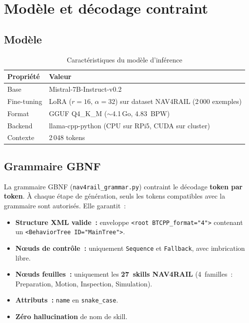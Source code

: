 \documentclass[a4paper,11pt]{article}
\newcommand{\file}[1]{\texttt{#1}}
\begin{document}
\section{Modèle et décodage contraint}
\label{sec:model}

\subsection{Modèle}

\begin{table}[H]
\centering
\caption{Caractéristiques du modèle d'inférence}
\label{tab:model}
\begin{tabularx}{\textwidth}{@{}l X@{}}
\toprule
\textbf{Propriété} & \textbf{Valeur} \\
\midrule
Base         & Mistral-7B-Instruct-v0.2 \\
Fine-tuning  & LoRA ($r=16$, $\alpha=32$) sur dataset NAV4RAIL (2\,000 exemples) \\
Format       & GGUF Q4\_K\_M ($\sim$4.1\,Go, 4.83~BPW) \\
Backend      & llama-cpp-python (CPU sur RPi5, CUDA sur cluster) \\
Contexte     & 2\,048 tokens \\
\bottomrule
\end{tabularx}
\end{table}

\subsection{Grammaire GBNF}
\label{sec:gbnf}

La grammaire GBNF (\file{nav4rail\_grammar.py}) contraint le décodage
\textbf{token par token}. À chaque étape de génération, seuls les tokens
compatibles avec la grammaire sont autorisés. Elle garantit~:

\begin{itemize}
    \item \textbf{Structure XML valide~:} enveloppe
    \texttt{<root BTCPP\_format="4">} contenant un \texttt{<Behavior\-Tree ID="MainTree">}.
    \item \textbf{Nœuds de contrôle~:} uniquement \texttt{Sequence} et
    \texttt{Fallback}, avec imbrication libre.
    \item \textbf{Nœuds feuilles~:} uniquement les \textbf{27~skills
    NAV4RAIL} (4~familles~: Preparation, Motion, Inspection, Simulation).
    \item \textbf{Attributs~:} \texttt{name} en \texttt{snake\_case}.
    \item \textbf{Zéro hallucination} de nom de skill.
\end{itemize}
\end{document}
